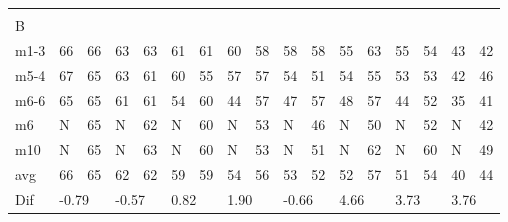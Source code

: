\begin{table}[H]
\begin{tabular}{l|l|l|l|l|l|l|l|l|l|l|l|l|l|l|l|l}
\multicolumn{17}{l}{ } \\   
B & \multicolumn{2}{l|}{} & \multicolumn{2}{l|}{} & \multicolumn{2}{l|}{} & \multicolumn{2}{l|}{} & \multicolumn{2}{l|}{} & \multicolumn{2}{l|}{}& \multicolumn{2}{l|}{}& \multicolumn{2}{l}{}     \\ \hline
m1-3   &    66    &    66    &   63    &   63       &    61   &   61    &   60     &   58     &    58   &    58     &    55   &     63     &      55   &    54    &  43 &  42  \\
m5-4   &    67    &    65    &   63    &  61        &    60   &  55     &   57     &    57    &  54     &     51    &   54    &     55     &     53    &    53    &  42 &  46  \\
m6-6   &   65     &   65     &   61    &  61        &   54    &   60    &    44    &    57    &   47    &     57    &     48  &    57      &     44    &   52     &  35 &  41  \\
m6      &   N       &      65  &    N    &     62     &    N     &   60    &   N      &    53    &   N     &      46   &   N      &      50    &     N     &     52   &   N  &   42 \\
m10    &   N       &    65    &    N    &     63     &    N     &   60    &   N      &    53    &   N     &     51    &     N    &     62     &     N     &     60   &    N  &  49  \\ \hline
avg     &     66    &     65   &    62   &     62     &     59  &   59    &   54     &   56     &     53  &  52       &     52   &    57     &       51  &   54     & 40   & 44\\ \hline
Dif & \multicolumn{2}{l|}{-0.79} & \multicolumn{2}{l|}{-0.57} & \multicolumn{2}{l|}{0.82} & \multicolumn{2}{l|}{1.90} & \multicolumn{2}{l|}{-0.66} & \multicolumn{2}{l|}{4.66}& \multicolumn{2}{l|}{3.73}& \multicolumn{2}{l}{3.76}       
\end{tabular}
\end{table}


